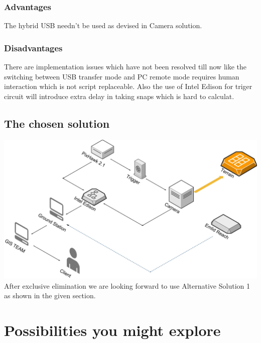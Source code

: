 \documentclass[12pt]{report}
\begin{document}
\subsection{Advantages}
The hybrid USB needn't be used as devised in Camera solution.
\subsection{Disadvantages} 
There are implementation issues which have not been resolved till now like the switching between USB transfer mode and PC remote mode requires human interaction which is not script replaceable. Also the use of Intel Edison for triger circuit will introduce extra delay in taking snaps which is hard to calculat.
 
 
\section{The chosen solution}
 \includegraphics[width=\linewidth]{Alternative_Solution1.jpg} 
After exclusive elimination we are looking forward to use Alternative Solution 1 as shown in the given section.


\chapter{Possibilities you might explore}
\end{document}
